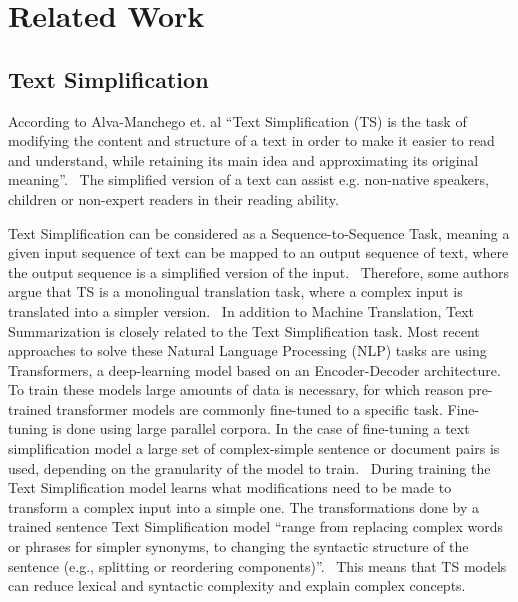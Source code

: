 \section{Related Work}
\subsection{Text Simplification}
According to Alva-Manchego et. al ``Text Simplification (TS) is the task of modifying the content and structure of a text in order to
make it easier to read and understand, while retaining its main idea and approximating its original meaning''.~\cite{AlvaManchego2020}
The simplified version of a text can assist e.g. non-native speakers, children or non-expert readers in their reading ability.~\cite{AlvaManchego2020, Jiang2020}

Text Simplification can be considered as a Sequence-to-Sequence Task, meaning a given input sequence of text can be mapped to an
output sequence of text, where the output sequence is a simplified version of the input.~\cite{Goldberg2017}
Therefore, some authors argue that TS is a monolingual translation task, where a complex input is translated into a simpler version.~\cite{Aumiller2022}
In addition to Machine Translation, Text Summarization is closely related to the Text Simplification task.
Most recent approaches to solve these Natural Language Processing (NLP) tasks are using Transformers, a deep-learning model based on an Encoder-Decoder architecture.
To train these models large amounts of data is necessary, for which reason pre-trained transformer models are commonly fine-tuned to a specific task.
Fine-tuning is done using large parallel corpora. In the case of fine-tuning a text simplification model a large set of complex-simple sentence or document pairs is used,
depending on the granularity of the model to train.~\cite{Jurafsky2023} During training the Text Simplification model learns what modifications need to be made to transform a complex input into a simple one.
The transformations done by a trained sentence Text Simplification model ``range from replacing complex words or phrases for simpler synonyms, to changing the
syntactic structure of the sentence (e.g., splitting or reordering components)''.~\cite{AlvaManchego2020} This means that TS models can reduce 
lexical and syntactic complexity and explain complex concepts.~\cite{Saeuberli2020}



